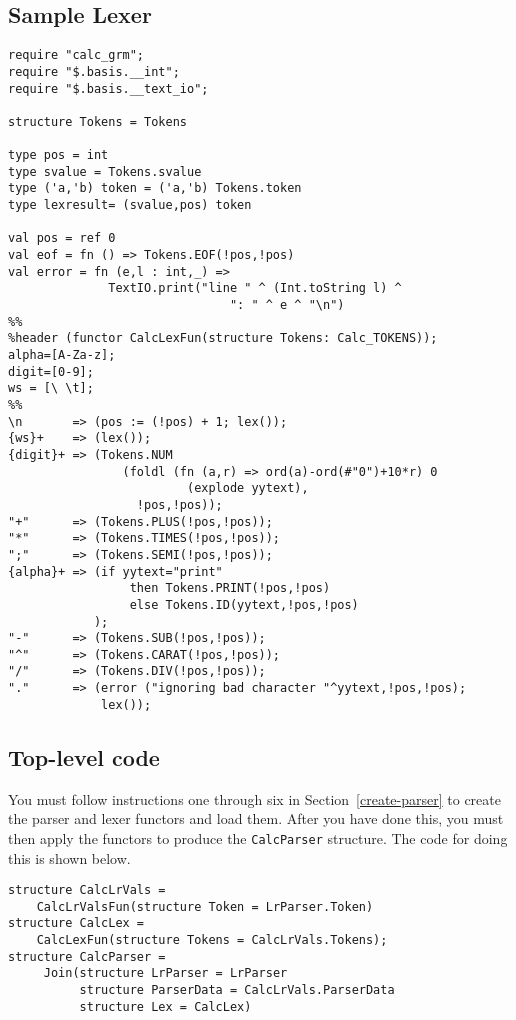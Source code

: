 \documentclass{article}
\begin{document}
\subsection{Sample Lexer}
\begin{tt}
\begin{verbatim}
require "calc_grm";
require "$.basis.__int";
require "$.basis.__text_io";

structure Tokens = Tokens

type pos = int
type svalue = Tokens.svalue
type ('a,'b) token = ('a,'b) Tokens.token
type lexresult= (svalue,pos) token

val pos = ref 0
val eof = fn () => Tokens.EOF(!pos,!pos)
val error = fn (e,l : int,_) =>
              TextIO.print("line " ^ (Int.toString l) ^
                               ": " ^ e ^ "\n")
%%
%header (functor CalcLexFun(structure Tokens: Calc_TOKENS));
alpha=[A-Za-z];
digit=[0-9];
ws = [\ \t];
%%
\n       => (pos := (!pos) + 1; lex());
{ws}+    => (lex());
{digit}+ => (Tokens.NUM
                (foldl (fn (a,r) => ord(a)-ord(#"0")+10*r) 0
                         (explode yytext),
                  !pos,!pos));
"+"      => (Tokens.PLUS(!pos,!pos));
"*"      => (Tokens.TIMES(!pos,!pos));
";"      => (Tokens.SEMI(!pos,!pos));
{alpha}+ => (if yytext="print"
                 then Tokens.PRINT(!pos,!pos)
                 else Tokens.ID(yytext,!pos,!pos)
            );
"-"      => (Tokens.SUB(!pos,!pos));
"^"      => (Tokens.CARAT(!pos,!pos));
"/"      => (Tokens.DIV(!pos,!pos));
"."      => (error ("ignoring bad character "^yytext,!pos,!pos);
             lex());
\end{verbatim}
\end{tt}
\subsection{Top-level code}

You must follow instructions one through six in Section~\ref{create-parser}
to create the parser and lexer functors and load them.  After you have
done this, you must then apply the functors to produce the {\tt CalcParser}
structure.  The code for doing this is shown below.
\begin{verbatim}
structure CalcLrVals =
    CalcLrValsFun(structure Token = LrParser.Token)
structure CalcLex =
    CalcLexFun(structure Tokens = CalcLrVals.Tokens);
structure CalcParser =
     Join(structure LrParser = LrParser
          structure ParserData = CalcLrVals.ParserData
          structure Lex = CalcLex)
\end{verbatim}
 
\end{document}
